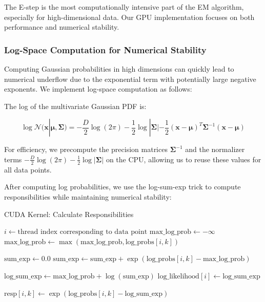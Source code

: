 \documentclass[conference]{IEEEtran}
\begin{document}
The E-step is the most computationally intensive part of the EM algorithm, especially for high-dimensional data. Our GPU implementation focuses on both performance and numerical stability.

\subsubsection{Log-Space Computation for Numerical Stability}

Computing Gaussian probabilities in high dimensions can quickly lead to numerical underflow due to the exponential term with potentially large negative exponents. We implement log-space computation as follows:

The log of the multivariate Gaussian PDF is:

\begin{equation}
\log \mathcal{N}(\mathbf{x}|\boldsymbol{\mu}, \boldsymbol{\Sigma}) = -\frac{D}{2}\log(2\pi) - \frac{1}{2}\log|\boldsymbol{\Sigma}| - \frac{1}{2}(\mathbf{x}-\boldsymbol{\mu})^T \boldsymbol{\Sigma}^{-1} (\mathbf{x}-\boldsymbol{\mu})
\end{equation}

For efficiency, we precompute the precision matrices $\boldsymbol{\Sigma}^{-1}$ and the normalizer terms $-\frac{D}{2}\log(2\pi) - \frac{1}{2}\log|\boldsymbol{\Sigma}|$ on the CPU, allowing us to reuse these values for all data points.



After computing log probabilities, we use the log-sum-exp trick to compute responsibilities while maintaining numerical stability:

\begin{algorithm}
    \caption{CUDA Kernel: Calculate Responsibilities}
    \begin{algorithmic}[1]
    \STATE $i \gets \textrm{thread index corresponding to data point}$
        \STATE $\textrm{max\_log\_prob} \gets -\infty$ 
            \STATE $\textrm{max\_log\_prob} \gets \max(\textrm{max\_log\_prob}, \textrm{log\_probs}[i, k])$
        \ENDFOR
        
        \STATE $\textrm{sum\_exp} \gets 0.0$
            \STATE $\textrm{sum\_exp} \gets \textrm{sum\_exp} + \exp(\textrm{log\_probs}[i, k] - \textrm{max\_log\_prob})$
        \ENDFOR
        
        \STATE $\textrm{log\_sum\_exp} \gets \textrm{max\_log\_prob} + \log(\textrm{sum\_exp})$
        \STATE $\textrm{log\_likelihood}[i] \gets \textrm{log\_sum\_exp}$ 
        
            \STATE $\textrm{resp}[i, k] \gets \exp(\textrm{log\_probs}[i, k] - \textrm{log\_sum\_exp})$
        \ENDFOR
    \ENDIF
    \end{algorithmic}
    \end{algorithm}
\end{document}
